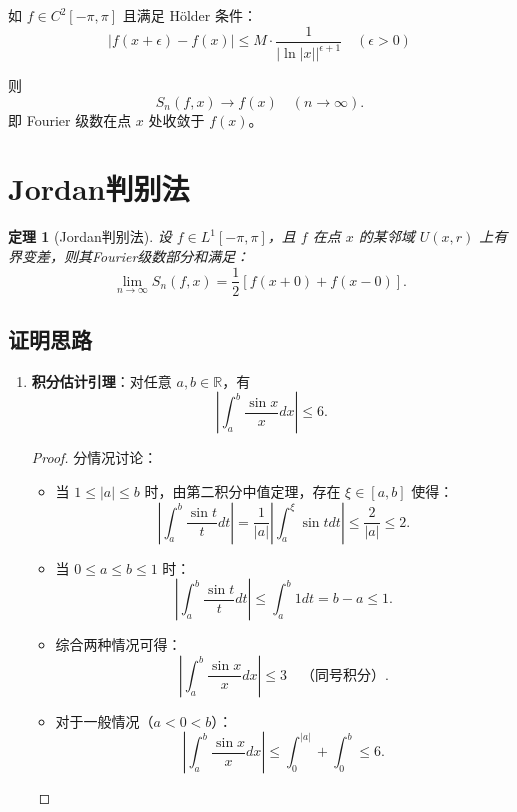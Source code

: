 \documentclass[12pt]{article}
\newtheorem{theorem}{定理}  %
\begin{document}
如 \( f \in C^2[-\pi, \pi] \) 且满足 Hölder 条件：
\[
|f(x+\epsilon) - f(x)| \leq M \cdot \frac{1}{\left|\ln|x|\right|^{\epsilon+1}} \quad (\epsilon > 0)
\]

则 
\[
S_n(f, x) \to f(x) \quad (n \to \infty).
\]
	即 Fourier 级数在点 $x$ 处收敛于 $f(x)$。
	
\section{Jordan判别法}

\begin{theorem}[Jordan判别法]
	设 $f \in L^1[-\pi, \pi]$，且 $f$ 在点 $x$ 的某邻域 $U(x,r)$ 上有界变差，则其Fourier级数部分和满足：
	\[
	\lim_{n \to \infty} S_n(f, x) = \frac{1}{2} \left[ f(x+0) + f(x-0) \right].
	\]
\end{theorem}

\subsection{证明思路}
\begin{enumerate}[leftmargin=2cm]
	\item \textbf{积分估计引理}：对任意 $a,b \in \mathbb{R}$，有
	\[
	\left| \int_a^b \frac{\sin x}{x} dx \right| \leq 6.
	\]
	
	\begin{proof}
		分情况讨论：
		\begin{itemize}
			\item 当 $1 \leq |a| \leq b$ 时，由第二积分中值定理，存在 $\xi \in [a,b]$ 使得：
			\[
			\left| \int_a^b \frac{\sin t}{t} dt \right| = \frac{1}{|a|} \left| \int_a^\xi \sin t dt \right| \leq \frac{2}{|a|} \leq 2.
			\]
			
			\item 当 $0 \leq a \leq b \leq 1$ 时：
			\[
			\left| \int_a^b \frac{\sin t}{t} dt \right| \leq \int_a^b 1 dt = b - a \leq 1.
			\]
			
			\item 综合两种情况可得：
			\[
			\left| \int_a^b \frac{\sin x}{x} dx \right| \leq 3 \quad \text{（同号积分）}.
			\]
			
			\item 对于一般情况（$a<0<b$）：
			\[
			\left| \int_a^b \frac{\sin x}{x} dx \right| \leq \int_0^{|a|} + \int_0^b \leq 6.
			\]
		\end{itemize}
	\end{proof}
\end{enumerate}
\end{document}
